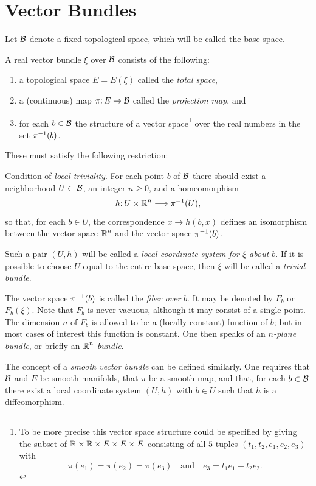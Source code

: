 \newpage
\chapter{Vector Bundles}\label{ch2}
Let $\mathcal{B}$ denote a fixed topological space, which will be called the
base space.
\begin{definition}\label{def:2-1}
	A real vector bundle $\xi$ over $\mathcal{B}$ consists of the 
	following:
	\begin{enumerate}[label=\arabic*),leftmargin=2\parindent ]
		\item a topological space $E=
		E(\xi)$ called the \textit{total space},
		\item  a (continuous) map $\pi\mathpunct{:} E \to \mathcal{B}$ called the \textit{projection map}, and
		\item  for each $b\in \mathcal{B}$ the structure of a vector space\footnote{To be more precise this vector space structure could be specified by giving
			the subset of $\boldsymbol{\mathbb{R}}\times\boldsymbol{\mathbb{R}}\times E\times E\times E$ consisting of all $5$-tuples $(t_1,t_2,e_1,e_2,e_3)$ with \[\pi(e_1)=\pi(e_2) = \pi(e_3)\quad\text{and}\quad e_3 = t_1e_1 + t_2e_2.\]} over the real 
		numbers in the set $\pi^{-1}(b)$.
	\end{enumerate}
\end{definition}

These must satisfy the following restriction:

Condition of \textit{local triviality}. For each point $b$ of $\mathcal{B}$ there should
exist a neighborhood $U \subset \mathcal{B}$, an integer $n \geq 0$, and a homeomorphism
\[h\mathpunct{:}U\times \boldsymbol{\mathbb{R}}^n\longrightarrow\pi^{-1}(U),\]
so that, for each $b\in U$, the correspondence $x \to h(b, x)$ defines an isomorphism between the vector space $\boldsymbol{\mathbb{R}}^n$ and the vector space $\pi^{-1}(b)$.

Such a pair $(U, h)$ will be called a \textit{local coordinate system for $\xi$
about $b$}. If it is possible to choose $U$ equal to the entire base space,
then $\xi$ will be called a \textit{trivial bundle}.

The vector space $\pi^{-1}(b)$ is called the \textit{fiber over} $b$. It may be 
denoted by $F_b$ or
$F_b(\xi)$. Note that $F_b$ is never vacuous, although it may
consist of a single point. The dimension $n$ of $F_b$ is allowed to be a (locally constant) function of $b$; but in most cases of interest this 
function is constant. One then speaks of an $n$\textit{-plane bundle}, or briefly an $\boldsymbol{\mathbb{R}}^n$-\textit{bundle}.

The concept of a \textit{smooth vector bundle} can be defined similarly. One
requires that $\mathcal{B}$ and $E$ be smooth manifolds, that $\pi$ be a smooth map,
and that, for each $b\in \mathcal{B}$ there exist a local coordinate system $(U, h)$
with $b \in U$ such that $h$ is a diffeomorphism.


